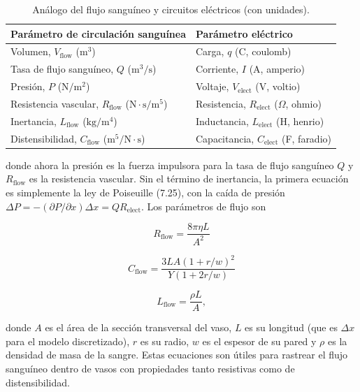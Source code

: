 \documentclass[12pt,a4paper]{book}
\begin{document}
\begin{table}[htbp]
\centering
\caption{Análogo del flujo sanguíneo y circuitos eléctricos (con unidades).}
\label{tab:D1}
\begin{tabularx}{\textwidth}{>{\hsize=1.0\hsize}X >{\hsize=1.0\hsize}X}
\toprule
\textbf{Parámetro de circulación sanguínea} & \textbf{Parámetro eléctrico} \\
\midrule
Volumen, $V_{\text{flow}}$ ($\text{m}^3$) & Carga, $q$ (C, coulomb) \\
Tasa de flujo sanguíneo, $Q$ ($\text{m}^3/\text{s}$) & Corriente, $I$ (A, amperio) \\
Presión, $P$ ($\text{N}/\text{m}^2$) & Voltaje, $V_{\text{elect}}$ (V, voltio) \\
Resistencia vascular, $R_{\text{flow}}$ ($\text{N}\cdot\text{s}/\text{m}^5$) & Resistencia, $R_{\text{elect}}$ ($\Omega$, ohmio) \\
Inertancia, $L_{\text{flow}}$ ($\text{kg}/\text{m}^4$) & Inductancia, $L_{\text{elect}}$ (H, henrio) \\
Distensibilidad, $C_{\text{flow}}$ ($\text{m}^5/\text{N}\cdot\text{s}$) & Capacitancia, $C_{\text{elect}}$ (F, faradio) \\
\bottomrule
\end{tabularx}
\end{table}

donde ahora la presión es la fuerza impulsora para la tasa de flujo sanguíneo $Q$ y $R_{\text{flow}}$ es la resistencia vascular. Sin el término de inertancia, la primera ecuación es simplemente la ley de Poiseuille (7.25), con la caída de presión $\Delta P = -(\partial P/\partial x)\Delta x = Q R_{\text{elect}}$. Los parámetros de flujo son

\begin{equation}
R_{\text{flow}} = \frac{8\pi\eta L}{A^2} \label{eq:D.12}
\end{equation}

\begin{equation}
C_{\text{flow}} = \frac{3L A(1 + r/w)^2}{Y(1 + 2r/w)} \label{eq:D.13}
\end{equation}

\begin{equation}
L_{\text{flow}} = \frac{\rho L}{A}, \label{eq:D.14}
\end{equation}

donde $A$ es el área de la sección transversal del vaso, $L$ es su longitud (que es $\Delta x$ para el modelo discretizado), $r$ es su radio, $w$ es el espesor de su pared y $\rho$ es la densidad de masa de la sangre. Estas ecuaciones son útiles para rastrear el flujo sanguíneo dentro de vasos con propiedades tanto resistivas como de distensibilidad.
\end{document}
